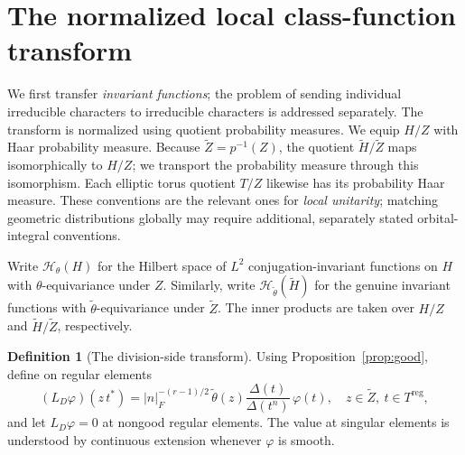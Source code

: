 \documentclass[11pt]{article}
\newcommand{\tH}{\widetilde H}
\newcommand{\tZ}{\widetilde Z}
\newcommand{\reg}{\mathrm{reg}}
\theoremstyle{plain}
\theoremstyle{definition}
\newtheorem{definition}[theorem]{Definition}
\begin{document}
\section{The normalized local class-function transform}\label{sec:local}
We first transfer \emph{invariant functions}; the problem of sending
individual irreducible characters to irreducible characters is
addressed separately. The transform is normalized using quotient
probability measures.
We equip $H/Z$ with Haar probability measure. Because $\tZ=p^{-1}(Z)$, the quotient $\tH/\tZ$ maps isomorphically to $H/Z$; we transport the probability measure through this isomorphism. Each elliptic torus quotient $T/Z$ likewise has its probability Haar measure. These conventions are the relevant ones for \emph{local unitarity}; matching geometric distributions globally may require additional, separately stated orbital-integral conventions.

Write $\mathcal H_\theta(H)$ for the Hilbert space of $L^2$ conjugation-invariant functions on $H$ with $\theta$-equivariance under $Z$. Similarly, write $\mathcal H_{\widetilde\theta}(\tH)$ for the genuine invariant functions with $\widetilde\theta$-equivariance under $\tZ$. The inner products are taken over $H/Z$ and $\tH/\tZ$, respectively.

\begin{definition}[The division-side transform]\label{def:L}
Using Proposition~\ref{prop:good}, define on regular elements
\begin{equation}\label{eq:transfer}
\boxed{\quad
(L_D\varphi)(z\,t^*)=
|n|_F^{-(r-1)/2}\,\widetilde\theta(z)
\frac{\Delta(t)}{\Delta(t^n)}\,\varphi(t),
\quad z\in\tZ,
\ t\in T^{\reg},\quad}
\end{equation}
and let $L_D\varphi=0$ at nongood regular elements. The value at singular elements is understood by continuous extension whenever $\varphi$ is smooth.
\end{definition}
\end{document}
